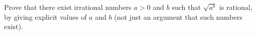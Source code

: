 Prove that there exist irrational numbers $a>0$ and $b$ such that $\sqrt{a^b}$ is rational, by giving explicit values of $a$ and $b$ (not just an argument that such numbers exist).
